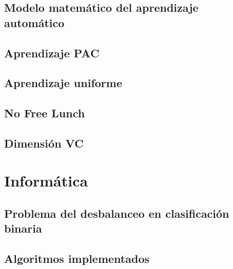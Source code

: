 \documentclass[dottedtoc, headinclude, footinclude=true]{scrreprt}
\begin{document}
  \chapter{Modelo matemático del aprendizaje automático}
    
  \chapter{Aprendizaje PAC}
    
  \chapter{Aprendizaje uniforme}
    
  \chapter{No Free Lunch}
    
  \chapter{Dimensión VC}
    
  
\part{Informática}
  \chapter{Problema del desbalanceo en clasificación binaria}
    
  \chapter{Algoritmos implementados}
    
    
    
    


\end{document}
